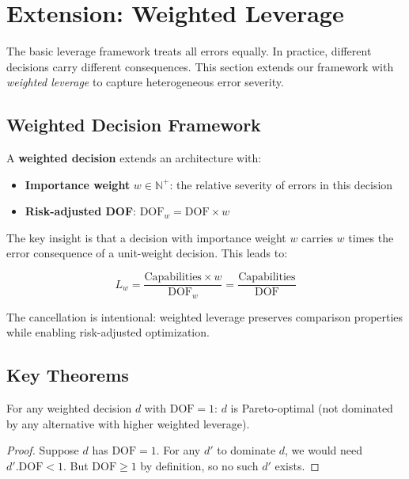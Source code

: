 \section{Extension: Weighted Leverage}\label{weighted-leverage}

The basic leverage framework treats all errors equally. In practice, different decisions carry different consequences. This section extends our framework with \emph{weighted leverage} to capture heterogeneous error severity.

\subsection{Weighted Decision Framework}

\begin{definition}
A \textbf{weighted decision} extends an architecture with:
\begin{itemize}
\item \textbf{Importance weight} $w \in \mathbb{N}^+$: the relative severity of errors in this decision
\item \textbf{Risk-adjusted DOF}: $\text{DOF}_w = \text{DOF} \times w$
\end{itemize}
\end{definition}

The key insight is that a decision with importance weight $w$ carries $w$ times the error consequence of a unit-weight decision. This leads to:

\begin{definition}
\[
L_w = \frac{\text{Capabilities} \times w}{\text{DOF}_w} = \frac{\text{Capabilities}}{\text{DOF}}
\]
\end{definition}

The cancellation is intentional: weighted leverage preserves comparison properties while enabling risk-adjusted optimization.

\subsection{Key Theorems}

\begin{theorem}
For any weighted decision $d$ with $\text{DOF} = 1$: $d$ is Pareto-optimal (not dominated by any alternative with higher weighted leverage).
\end{theorem}

\begin{proof}
Suppose $d$ has $\text{DOF} = 1$. For any $d'$ to dominate $d$, we would need $d'.\text{DOF} < 1$. But $\text{DOF} \geq 1$ by definition, so no such $d'$ exists.
\end{proof}

